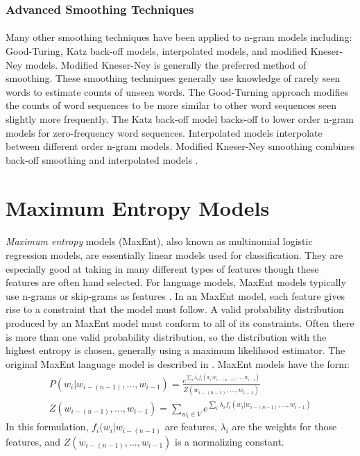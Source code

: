 \subsubsection{Advanced Smoothing Techniques}
\paragraph{}
Many other smoothing techniques have been applied to n-gram models including: Good-Turing, Katz back-off models, interpolated models, and modified Kneser-Ney models. Modified Kneser-Ney is generally the preferred method of smoothing. These smoothing techniques generally use knowledge of rarely seen words to estimate counts of unseen words. The Good-Turning approach modifies the counts of word sequences to be more similar to other word sequences seen slightly more frequently. The Katz back-off model backs-off to lower order n-gram models for zero-frequency word sequences. Interpolated models interpolate between different order n-gram models. Modified Kneser-Ney smoothing combines back-off smoothing and interpolated models \cite{Jurafsky2009}.

\section{Maximum Entropy  Models}
\paragraph{}
\emph{Maximum entropy} models (MaxEnt), also known as multinomial logistic regression models, are essentially linear models used for classification. They are especially good at taking in many different types of features though these features are often hand selected. For language models, MaxEnt models typically use n-grams or skip-grams as features \cite{Mikolov2012}. In an MaxEnt model, each feature gives rise to a constraint that the model must follow. A valid probability distribution produced by an MaxEnt model must conform to all of its constraints. Often there is more than one valid probability distribution, so the distribution with the highest entropy is chosen, generally using a maximum likelihood estimator. The original MaxEnt language model is described in \cite{Rosenfeld1994}.
MaxEnt models have the form:
\begin{align}
P(w_i | w_{i-(n-1)},\dots, w_{i-1}) = \frac{e^{\sum_i \lambda_i f_i(w_i | w_{i-(n-1)},\dots, w_{i-1})}}{Z(w_{i-(n-1)},
\dots, w_{i-1})} \label{eq:maxent}
\\Z(w_{i-(n-1)},\dots, w_{i-1}) = \sum_{w_i \in V} e^{\sum_i \lambda_i f_i(w_i | w_{i-(n-1)},\dots, w_{i-1})}
\end{align}
In this formulation, $f_i(w_i | w_{i-(n-1)}$ are features, $\lambda_i$ are the weights for those features, and $Z(w_{i-(n-1)},\dots, w_{i-1})$ is a normalizing constant.
